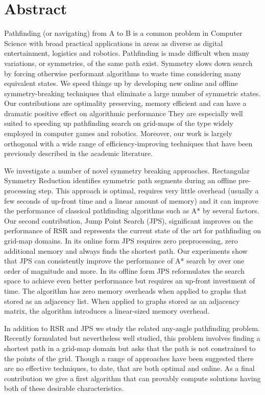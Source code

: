 \chapter*{Abstract}
\vspace{-1em}
Pathfinding (or navigating) from A to B is a common problem in Computer
Science with broad practical applications in areas as diverse as digital
entertainment, logistics and robotics. Pathfinding is made difficult when
many variations, or symmetries, of the same path exist.  Symmetry slows down
search by forcing otherwise performant algorithms to waste time considering
many equivalent states.  We speed things up by developing new online and
offline symmetry-breaking techniques that eliminate a large number of
symmetric states.  Our contributions are optimality preserving, memory
efficient and can have a dramatic positive effect on algorithmic performance 
They are especially well suited to speeding up pathfinding search on grid-maps 
of the type widely employed in computer games and robotics.
Moreover, our work is largely orthogonal with a wide range of
efficiency-improving techniques that have been previously described in the
academic literature.
\par 
We investigate a number of novel symmetry breaking approaches.
Rectangular Symmetry Reduction identifies symmetric path segments during an 
offline pre-processing step.
This approach is optimal, requires very little overhead (usually a few seconds of
up-front time and a linear amount of memory) and it can improve
the performance of classical pathfinding algorithms such as A{*} by several factors.
Our second contribution, Jump Point
Search (JPS), significant improves on the performance of RSR and
represents the current state of the art for pathfinding on grid-map domains.
In its online form JPS requires zero preprocessing, zero additional memory and
always finds the shortest path. Our experiments show that JPS can consistently
improve the performance of A{*} search by over one order of magnitude and more.
In its offline form JPS reformulates the search space to achieve even better
performance but requires an up-front investment of time. The algorithm has
zero memory overheads when applied to graphs that stored as an adjacency list.
When applied to graphs stored as an adjacency matrix, the algorithm introduces
a linear-sized memory overhead. 
\par
In addition to RSR and JPS we study the related any-angle pathfinding problem.
Recently formulated but nevertheless well studied, this problem involves finding 
a shortest path in a grid-map domain but asks that the path
is not constrained to the points of the grid.  Though a range of approaches have
been suggested there are no effective techniques, to date, that are both optimal
and online.
As a final contribution we give a first algorithm that can provably compute 
solutions having both of these desirable characteristics.
